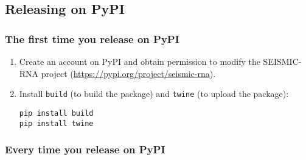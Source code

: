 \documentclass[main.tex]{subfiles}
\begin{document}
\subsection{Releasing on PyPI}

\subsubsection{The first time you release on PyPI}

\begin{enumerate}
    \item Create an account on PyPI and obtain permission to modify the SEISMIC-RNA project (\url{https://pypi.org/project/seismic-rna}).
    \item Install \verb|build| (to build the package) and \verb|twine| (to upload the package):
        \begin{verbatim}
pip install build
pip install twine
        \end{verbatim}
\end{enumerate}


\subsubsection{Every time you release on PyPI}
\end{document}
